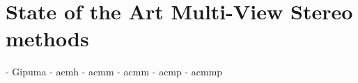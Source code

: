\chapter{State of the Art Multi-View Stereo methods}

- Gipuma \cite{gipuma}
- acmh \cite{acmh_acmm}
- acmm \cite{acmh_acmm}
- acmm \cite{acmh_acmm}
- acmp \cite{acmp}
- acmmp \cite{acmmp}